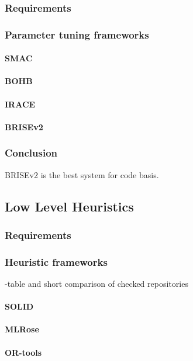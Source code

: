 \subsubsection{Requirements}
\subsubsection{Parameter tuning frameworks}
\paragraph{SMAC}
\paragraph{BOHB}
\paragraph{IRACE}
\paragraph{BRISEv2}
\subsubsection{Conclusion}
BRISEv2 is the best system for code basis.

\subsection{Low Level Heuristics}\label{concept:llh code basis selection}
\subsubsection{Requirements}
\subsubsection{Heuristic frameworks}
-table and short comparison of checked repositories 
\paragraph{SOLID}
\paragraph{MLRose}
\paragraph{OR-tools}
